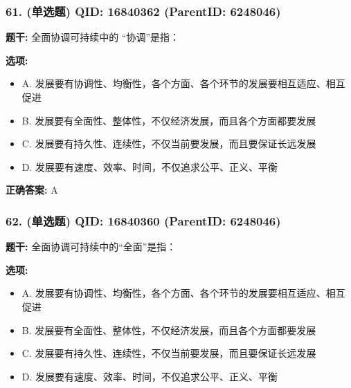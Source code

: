 \documentclass[12pt,UTF8]{ctexart}
\begin{document}
\vspace{0.3em}\hrulefill\vspace{0.7em}

\subsubsection*{61. (单选题) \small QID: 16840362 (ParentID: 6248046)}

\textbf{题干:}
全面协调可持续中的 “协调”是指：



\textbf{选项:}
\begin{itemize}[leftmargin=*]

  \item A. 发展要有协调性、均衡性，各个方面、各个环节的发展要相互适应、相互促进

  \item B. 发展要有全面性、整体性，不仅经济发展，而且各个方面都要发展

  \item C. 发展要有持久性、连续性，不仅当前要发展，而且要保证长远发展

  \item D. 发展要有速度、效率、时间，不仅追求公平、正义、平衡

\end{itemize}

\textbf{正确答案:}
A

\vspace{0.3em}\hrulefill\vspace{0.7em}

\subsubsection*{62. (单选题) \small QID: 16840360 (ParentID: 6248046)}

\textbf{题干:}
全面协调可持续中的“全面”是指：



\textbf{选项:}
\begin{itemize}[leftmargin=*]

  \item A. 发展要有协调性、均衡性，各个方面、各个环节的发展要相互适应、相互促进

  \item B. 发展要有全面性、整体性，不仅经济发展，而且各个方面都要发展

  \item C. 发展要有持久性、连续性，不仅当前要发展，而且要保证长远发展

  \item D. 发展要有速度、效率、时间，不仅追求公平、正义、平衡

\end{itemize}
\end{document}
